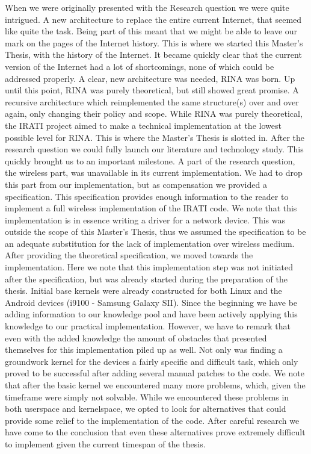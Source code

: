 When we were originally presented with the Research question we were quite intrigued. A new architecture to replace the entire current Internet, that seemed like quite the task. Being part of this meant that we might be able to leave our mark on the pages of the Internet history. This is where we started this Master's Thesis, with the history of the Internet. It became quickly clear that the current version of the Internet had a lot of shortcomings, none of which could be addressed properly. A clear, new architecture was needed, RINA was born. Up until this point, RINA was purely theoretical, but still showed great promise. A recursive architecture which reimplemented the same structure(s) over and over again, only changing their policy and scope. While RINA was purely theoretical, the IRATI project aimed to make a technical implementation at the lowest possible level for RINA. 
\npar
This is where the Master's Thesis is slotted in. After the research question we could fully launch our literature and technology study. This quickly brought us to an important milestone. A part of the research question, the wireless part, was unavailable in its current implementation. We had to drop this part from our implementation, but as compensation we provided a specification. This specification provides enough information to the reader to implement a full wireless implementation of the IRATI code. We note that this implementation is in essence writing a driver for a network device. This was outside the scope of this Master's Thesis, thus we assumed the specification to be an adequate substitution for the lack of implementation over wireless medium. 
\npar
After providing the theoretical specification, we moved towards the implementation. Here we note that this implementation step was not initiated after the specification, but was already started during the preparation of the thesis. Initial base kernels were already constructed for both Linux and the Android devices (i9100 - Samsung Galaxy SII). Since the beginning we have be adding information to our knowledge pool and have been actively applying this knowledge to our practical implementation. However, we have to remark that even with the added knowledge the amount of obstacles that presented themselves for this implementation piled up as well. Not only was finding a groundwork kernel for the devices a fairly specific and difficult task, which only proved to be successful after adding several manual patches to the code. We note that after the basic kernel we encountered many more problems, which, given the timeframe were simply not solvable. While we encountered these problems in both userspace and kernelspace, we opted to look for alternatives that could provide some relief to the implementation of the code. After careful research we have come to the conclusion that even these alternatives prove extremely difficult to implement given the current timespan of the thesis.

